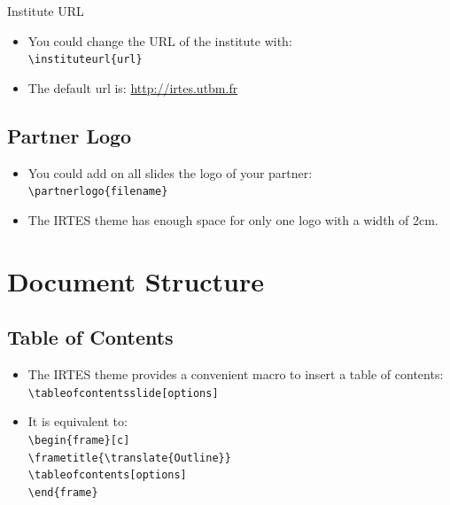 \documentclass[english,circlenumberstyle]{irtesbeamer}
\begin{document}
\begin{frame}{Institute URL}
	\begin{itemize}
	\item You could change the URL of the institute with: \\
		\texttt{{\textbackslash}instituteurl\{url\}}
	\item The default url is: \url{http://irtes.utbm.fr}
	\end{itemize}
\end{frame}

\subsection{Partner Logo}
\begin{frame}{\subsecname}
	\begin{itemize}
	\item You could add on all slides the logo of your partner: \\
		\texttt{{\textbackslash}partnerlogo\{filename\}}
	\item The IRTES theme has enough space for only one logo with a width of 2cm.
	\end{itemize}
\end{frame}

\section{Document Structure}

\subsection{Table of Contents}
\begin{frame}{\subsecname}
	\begin{itemize}
	\item The IRTES theme provides a convenient macro to insert a table of contents: \\
		\texttt{{\textbackslash}tableofcontentsslide[options]}
	\item It is equivalent to: \\
		\texttt{{\textbackslash}begin\{frame\}[c]} \\
		\texttt{{\textbackslash}frametitle\{{\textbackslash}translate\{Outline\}\}} \\
		\texttt{{\textbackslash}tableofcontents[options]} \\
		\texttt{{\textbackslash}end\{frame\}}
	\end{itemize}
\end{frame}
\end{document}
